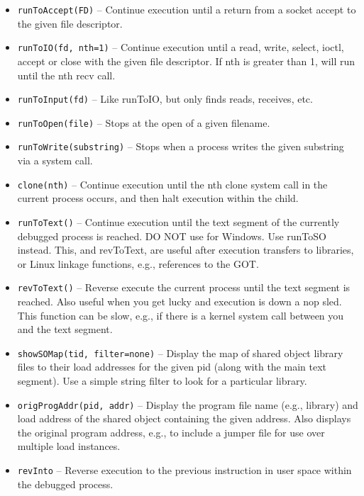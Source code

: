 \documentclass[titlepage]{article}
\begin{document}
\begin{itemize}
\item {\tt runToAccept(FD)} – Continue execution until a return from a socket accept to the given file descriptor.

\item {\tt runToIO(fd, nth=1)} – Continue execution until a read, write, select, ioctl, accept or close with the given file descriptor.  
If nth is greater than 1, will run until the nth recv call.  

\item {\tt runToInput(fd)} -- Like runToIO, but only finds reads, receives, etc.

\item {\tt runToOpen(file)} -- Stops at the open of a given filename.

\item {\tt runToWrite(substring)} -- Stops when a process writes the given substring via a system call.

\item {\tt clone(nth)} – Continue execution until the nth clone system call in the current process occurs, and then halt execution within the child.

\item {\tt runToText()} – Continue execution until the text segment of the currently debugged process is reached.  DO NOT use for Windows.  Use runToSO instead. 
This, and revToText, are useful after execution transfers to libraries, or Linux linkage functions, e.g., references to the GOT.

\item {\tt revToText()} – Reverse execute the current process until the text segment is reached.  Also useful when you get lucky and execution is down a nop sled.  This function can be slow, e.g., if there is a kernel system call between you and the text segment.
 
\item {\tt showSOMap(tid, filter=none)} – Display the map of shared object library files to their load addresses for the given pid (along with the main text segment).
Use a simple string filter to look for a particular library.

\item {\tt origProgAddr(pid, addr)} – Display the program file name (e.g., library) and load address of the shared object containing the given address.  Also displays the 
original program address, e.g., to include a jumper file for use over multiple load instances.

\item {\tt revInto} – Reverse execution to the previous instruction in user space within the debugged process. 


\end{itemize}
\end{document}
